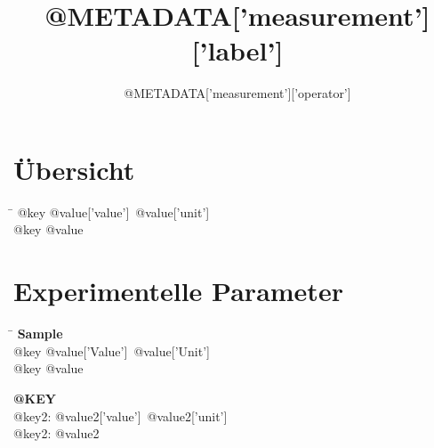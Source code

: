 \documentclass[11pt]{article}
\begin{document}
	\newcommand{\FilenameOneD}{{@FIGURENAMES[0]}}

\title{{@METADATA['measurement']['label']}}
\author{{@METADATA['measurement']['operator']}}
\maketitle

\section*{Übersicht}
\begin{tabbing}
	\hspace{3.5cm} \= \kill
		{@key} \> {@value['value']}~{@value['unit']}
		\\
		{@key} \> {@value}
		\\
\end{tabbing}

\section*{Experimentelle Parameter}

\begin{minipage}{\textwidth}
\begin{tabbing}
\hspace{3.5cm} \= \kill
\textbf{Sample}\\
		{@key} \> {@value['Value']}~{@value['Unit']}
		\\
		{@key} \> {@value}
		\\
\end{tabbing}
\end{minipage}

\begin{multicols}{2}
	\noindent\begin{minipage}{.49\textwidth}
	\textbf{{@KEY}}\\
			{@key2}: {@value2['value']}~{@value2['unit']}
			\\
			{@key2}: {@value2}
			\\
	\end{minipage}
\end{multicols}
\end{document}
